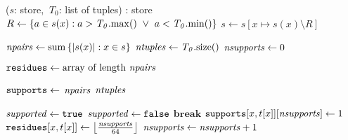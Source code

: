       \PROCEDURE \InitialiseCT($s$: store, %
      $\ T_0$: list of tuples) : store
       \label{line:init:-1} %
          \STATE $R \leftarrow \left\{a \in s(x) : a > \mathit{T_0}.\mathrm{max}()
                 \ \lor \ a < \mathit{T_0}.\mathrm{min}()\right\}$
           \STATE $s \leftarrow s[x \mapsto s(x) \setminus R]$                   
               \RETURN{$\emptyset$} \label{line:init:wipeout0}
          \ENDIF

       \ENDFOREACH \label{line:init:0}

      \STATE $\mathit{npairs} \leftarrow \mathrm{sum}\left\{|s(x)| : x \in s\right\}$
      \label{line:init:3}
      \STATE $\mathit{ntuples} \leftarrow \mathit{T_0}.\mathrm{size}()$ 
      \STATE $\mathit{nsupports} \leftarrow 0$  \label{line:init:4}
      
      \STATE $\texttt{residues} \leftarrow \text{array of length~} \mathit{npairs}$ \label{line:init:residue}
      
      \STATE $\texttt{supports} \leftarrow$ $\mathit{npairs}$ \label{line:init:supports}
      $\mathit{ntuples}$ \label{line:init:5}

       \label{line:init:6}
        \STATE $\mathit{supported} \leftarrow \texttt{true}$
            \STATE $\mathit{supported} \leftarrow \texttt{false}$
            \STATE $\textbf{break}$ 
          \ENDIF
        \ENDFOREACH
             \label{line:init:9}
              \STATE $\texttt{supports}[x,t[x]][\mathit{nsupports}] \leftarrow 1$ \label{line:init:10}
              \STATE $\texttt{residues}[x,t[x]] \leftarrow \left\lfloor\frac{\mathit{nsupports}}{64}\right\rfloor$
              \label{line:init:11}
              \STATE $\mathit{nsupports} \leftarrow \mathit{nsupports} + 1$
            \ENDFOREACH
          \ENDIF
      \ENDFOREACH \label{line:init:7}


